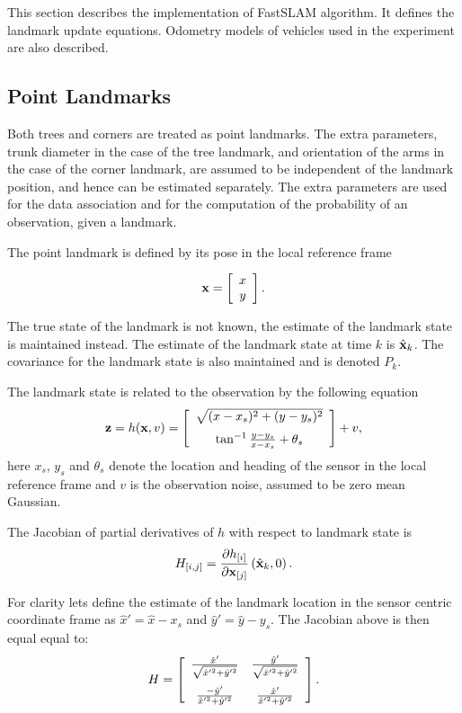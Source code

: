 This section describes the implementation of FastSLAM algorithm. It
defines the landmark update equations. Odometry models of vehicles
used in the experiment are also described.


\subsection{Point Landmarks}

Both trees and corners are treated as point landmarks. The extra
parameters, trunk diameter in the case of the tree landmark, and
orientation of the arms in the case of the corner landmark, are
assumed to be independent of the landmark position, and hence can be
estimated separately. The extra parameters are used for the data
association and for the computation of the probability of an
observation, given a landmark.

The point landmark is defined by its pose in the local reference
frame

$$
{\bf x} = \left[ \begin{array}{c} x\\y \end{array} \right].
$$

The true state of the landmark is not known, the estimate of the
landmark state is maintained instead. The estimate of the landmark
state at time $k$ is $\hat{\bf x}_k$. The covariance for the landmark
state is also maintained and is denoted $P_k$.

The landmark state is related to the observation by the following equation
$$
  {\bf z} = h({\bf x},v) = \left[
\begin{array}{c}
\sqrt{(x-x_s)^2 + (y-y_s)^2}\\ \noalign{\medskip}
\tan^{-1} \frac{y-y_s}{x-x_s} + \theta_s
\end{array}
\right] + v,
$$
here $x_s$, $y_s$ and $\theta_s$ denote the location and heading of
the sensor in the local reference frame and $v$ is the observation noise,
assumed to be zero mean Gaussian.

The Jacobian of partial derivatives of $h$ with respect to landmark
state is
$$
H_{[i,j]} = \frac{\partial h_{[i]}}{\partial {\bf x}_{[j]}}
             \left(\hat{\bf x}_k , 0 \right).
$$

For clarity lets define the estimate of the landmark location in the
sensor centric coordinate frame as $\hat{x}' = \hat{x} - x_s$ and
$\hat{y}' = \hat{y} - y_s$. The Jacobian above is then equal equal to:
$$
H = 
 \left[ \begin {array}{cc}
   \frac{\hat{x}'}{ \sqrt{\hat{x}'^2+\hat{y}'^2} } & 
   \frac{\hat{y}'}{ \sqrt{\hat{x}'^2+\hat{y}'^2} } \\ \noalign{\medskip}
   \frac{-\hat{y}'}{ \hat{x}'^2+\hat{y}'^2 } & 
   \frac{ \hat{x}'}{ \hat{x}'^2+\hat{y}'^2 }
\end{array} \right].
$$

